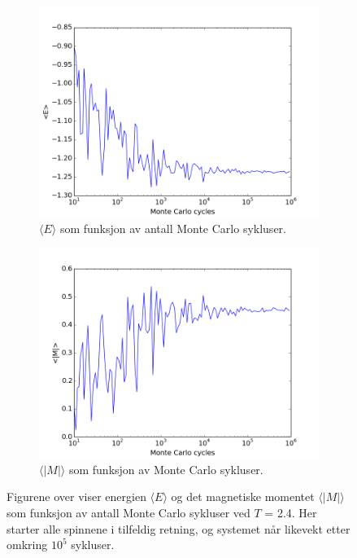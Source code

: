 \documentclass[11pt,a4paper]{article}
\begin{document}
\FloatBarrier
\begin{figure}[!ht]
\centering
\begin{subfigure}{.55\textwidth}
  \centering
  \includegraphics[width=1.1\linewidth]{4cT24randomE.png}
  \caption{$\langle E \rangle$ som funksjon av antall Monte Carlo sykluser. }
  \label{e4}
\end{subfigure}%
\begin{subfigure}{.55\textwidth}
  \centering
  \includegraphics[width=1.1\linewidth]{4cT24randomM.png}
  \caption{ $\langle |M| \rangle$ som funksjon av Monte Carlo sykluser. }
  \label{m4}
\end{subfigure}
\caption{Figurene over viser energien $\langle E \rangle$ og det magnetiske momentet $\langle |M| \rangle$ som funksjon av antall Monte Carlo sykluser ved $T$ = 2.4. Her starter alle spinnene i tilfeldig retning, og systemet når likevekt etter omkring $10^5$ sykluser.}
\label{fig:T24rand}
\end{figure}
\FloatBarrier
\end{document}
